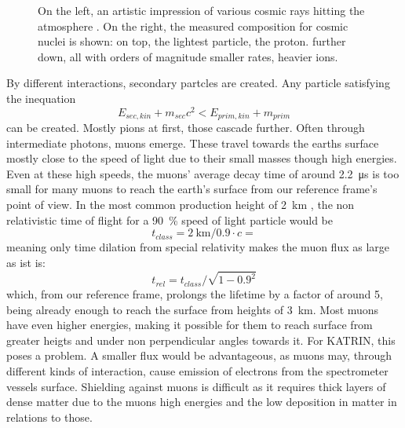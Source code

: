 \begin{figure}
\begin{minipage}[d]{0.49 \textwidth}
	\end{minipage}
	\caption[Cosmic ray composition]{On the left, an artistic impression of various cosmic rays hitting the atmosphere \cite{airShower}. On the right, the measured composition for cosmic nuclei is shown: on top, the lightest particle, the proton. further down, all with orders of magnitude smaller rates, heavier ions.}
    \end{figure}
    By different interactions, secondary partcles are created. Any particle satisfying the inequation \begin{equation}
      E_{sec,kin} + m_{sec} c^2 < E_{prim,kin} + m_{prim}
    \end{equation}
    can be created. Mostly pions at first, those cascade further. Often through intermediate photons, muons emerge. These travel towards the earths surface mostly close to the speed of light due to their small masses though high energies. Even at these high speeds, the muons' average decay time of around \SI{2.2}{\micro\second} \cite{muonLifetime} is too small for many muons to reach the earth's surface from our reference frame's point of view. In the most common production height of \SI{2}{\kilo\meter} \cite{muonProductionHeight}, the non relativistic time of flight for a \SI{90}{\percent} speed of light particle would be
    \begin{equation}
	t_{class} = \SI{2}{\kilo\meter} / 0.9\cdot c = 
    \end{equation}
    meaning only time dilation from special relativity makes the muon flux as large as ist is:
    \begin{equation}
    	t_{rel} = t_{class} / \sqrt{1-0.9^2}
    \end{equation}
    which, from our reference frame, prolongs the lifetime by a factor of around 5, being already enough to reach the surface from heights of \SI{3}{\kilo\meter}. Most muons have even higher energies, making it possible for them to reach surface from greater heigts and under non perpendicular angles towards it.
    For KATRIN, this poses a problem. A smaller flux would be advantageous, as muons may, through different kinds of interaction, cause emission of electrons from the spectrometer vessels surface. Shielding against muons is difficult as it requires thick layers of dense matter due to the muons high energies and the low deposition in matter in relations to those. 
    

